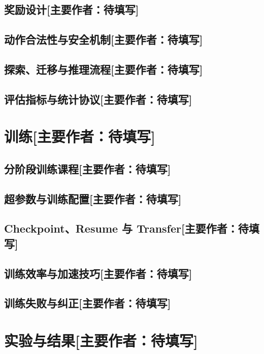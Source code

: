 \documentclass[UTF8,11pt,a4paper,fontset=none]{ctexart}
\newcommand{\primaryauthor}[1]{\texorpdfstring{\enspace\normalfont\small[主要作者：#1]}{ [主要作者：#1]}}
\newcommand{\authorsection}[2]{\section{#1\primaryauthor{#2}}}
\newcommand{\authorsubsection}[2]{\subsection{#1\primaryauthor{#2}}}
\newcommand{\pendingauthor}{待填写}
\newif\ifdraftguidance
\newcommand{\writingnote}[1]{%
  \ifdraftguidance
    \par\noindent\begingroup\color{promptblue}\small
    \fbox{\begin{minipage}{0.94\linewidth}\textbf{写作提示：}#1\end{minipage}}%
    \par\endgroup
  \fi
}
\newcommand{\todoitem}[1]{%
  \ifdraftguidance\textcolor{promptblue}{\textbf{[待补：#1]}}\fi
}
\begin{document}
\authorsubsection{奖励设计}{\pendingauthor}
\writingnote{区分正式游戏得分和训练辅助奖励；给出数值、触发条件、信用归因及防止刷分/循环的设计。多因素版本不能被描述成单因素因果结论。}
\todoitem{正文与奖励表}

\authorsubsection{动作合法性与安全机制}{\pendingauthor}
\writingnote{区分物理合法、危险预测、动作过滤和学习器排序。说明 fallback、规划时域、计算代价与已知反例；若使用规则层，论证它没有直接替代模型决定“最佳动作”。}
\todoitem{正文}

\authorsubsection{探索、迁移与推理流程}{\pendingauthor}
\writingnote{描述探索策略、replay、target 更新、checkpoint resume、policy-only transfer 和推理阶段。给出一张从 game state 到动作输出的流程图会更清楚。}
\todoitem{正文}

\authorsubsection{评估指标与统计协议}{\pendingauthor}
\writingnote{预先定义不同 Task 的主/次指标、基线、对手、场景、局数、环境种子、独立训练种子、冻结条件和统计方法。说明何时采用配对比较、置信区间或 bootstrap。}
\todoitem{正文与协议表}

\authorsection{训练}{\pendingauthor}
\writingnote{描述训练过程和用于加速或改善训练的技巧。按阶段说明初始化、训练预算、checkpoint 选择、迁移方式、旧任务保持和失败纠正。}

\authorsubsection{分阶段训练课程}{\pendingauthor}
\writingnote{逐 Task 说明场景、对手、允许动作、训练目标、晋级门槛和实际到达阶段。未运行的阶段明确标为未运行，不能填成零。}
\todoitem{正文或课程表}

\authorsubsection{超参数与训练配置}{\pendingauthor}
\writingnote{提供足以复现的参数表：优化器、学习率、折扣率、batch、replay、探索计划、目标同步、训练局数/步数、种子与设备。注明模型间哪些参数不同。}
\todoitem{配置表}

\authorsubsection{Checkpoint、Resume 与 Transfer}{\pendingauthor}
\writingnote{解释 checkpoint 保存内容、严格恢复与仅策略迁移的区别，以及特征/奖励/安全合同变化时如何避免误加载旧状态。}
\todoitem{正文}

\authorsubsection{训练效率与加速技巧}{\pendingauthor}
\writingnote{报告无 GUI、并行训练、GPU、缓存或数据复用等做法及其实际收益。最终提交 Agent 不得使用 multiprocessing；训练可使用。}
\todoitem{正文与测量结果}

\authorsubsection{训练失败与纠正}{\pendingauthor}
\writingnote{保留未收敛、遗忘、循环、自杀、指标缺陷或实现错误。说明诊断证据、修改内容，以及修改是否改变策略本身或只修复测量。}
\todoitem{正文}

\authorsection{实验与结果}{\pendingauthor}
\label{sec:results}
\writingnote{本章是报告重点。每组实验按“问题/假设—协议—结果—解释—决策”书写。用冻结策略和正式游戏指标，不用训练奖励代替评估。必须报告没有改善或失败的结果。}
\end{document}

